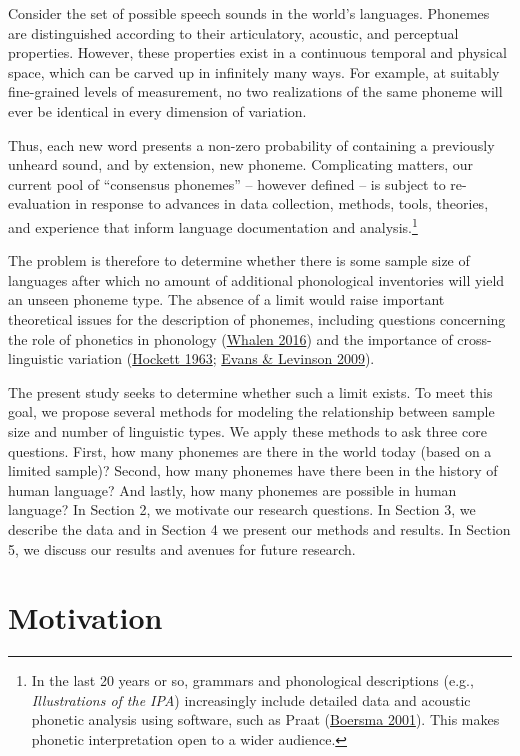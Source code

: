 \documentclass[
]{article}
\begin{document}
Consider the set of possible speech sounds in the world's languages.
Phonemes are distinguished according to their articulatory, acoustic,
and perceptual properties. However, these properties exist in a
continuous temporal and physical space, which can be carved up in
infinitely many ways. For example, at suitably fine-grained levels of
measurement, no two realizations of the same phoneme will ever be
identical in every dimension of variation.

Thus, each new word presents a non-zero probability of containing a
previously unheard sound, and by extension, new phoneme. Complicating
matters, our current pool of ``consensus phonemes'' -- however defined
-- is subject to re-evaluation in response to advances in data
collection, methods, tools, theories, and experience that inform
language documentation and analysis.\footnote{In the last 20 years or
  so, grammars and phonological descriptions (e.g., \emph{Illustrations
  of the IPA}) increasingly include detailed data and acoustic phonetic
  analysis using software, such as Praat
  (\protect\hyperlink{ref-Boersma2001}{Boersma 2001}). This makes
  phonetic interpretation open to a wider audience.}

The problem is therefore to determine whether there is some sample size
of languages after which no amount of additional phonological
inventories will yield an unseen phoneme type. The absence of a limit
would raise important theoretical issues for the description of
phonemes, including questions concerning the role of phonetics in
phonology (\protect\hyperlink{ref-Whalen2019}{Whalen 2016}) and the
importance of cross-linguistic variation
(\protect\hyperlink{ref-Hockett1963}{Hockett 1963};
\protect\hyperlink{ref-EvansLevinson2009}{Evans \& Levinson 2009}).

The present study seeks to determine whether such a limit exists. To
meet this goal, we propose several methods for modeling the relationship
between sample size and number of linguistic types. We apply these
methods to ask three core questions. First, how many phonemes are there
in the world today (based on a limited sample)? Second, how many
phonemes have there been in the history of human language? And lastly,
how many phonemes are possible in human language? In Section 2, we
motivate our research questions. In Section 3, we describe the data and
in Section 4 we present our methods and results. In Section 5, we
discuss our results and avenues for future research.

\hypertarget{motivation}{%
\section{Motivation}\label{motivation}}
\end{document}
